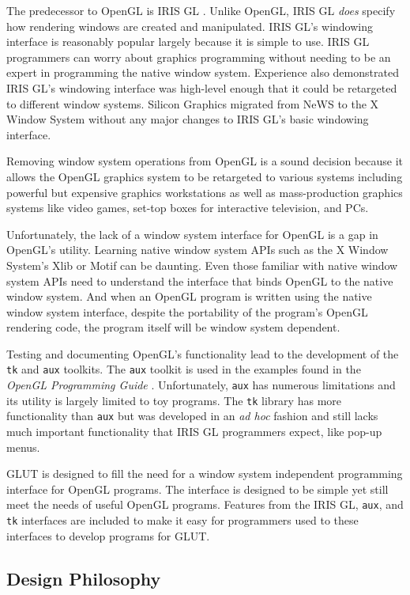 The predecessor to OpenGL is IRIS GL \cite{sgi91a,sgi91b}.
 Unlike OpenGL, IRIS GL {\em does}
specify how rendering windows are created and manipulated.  IRIS GL's
windowing interface is reasonably popular largely because it is simple
to use.  IRIS GL programmers can worry about graphics programming without
needing to be an expert in programming the native window system.
Experience also demonstrated IRIS GL's windowing interface was high-level
enough that it could be retargeted to different window systems.  Silicon
Graphics migrated from NeWS to the X Window System without any major
changes to IRIS GL's basic windowing interface.

Removing window system operations from OpenGL is a sound decision
because it allows the OpenGL graphics system to be retargeted to
various systems including powerful but expensive graphics
workstations as well as mass-production graphics systems like video
games, set-top boxes for interactive television, and PCs.

Unfortunately, the lack of a window system interface for OpenGL
is a gap in OpenGL's utility.  Learning native window system APIs
such as the X Window System's Xlib \cite{kilgard94a} or
Motif \cite{kilgard94b} can be daunting.
Even those familiar with native window system APIs need to
understand the interface that binds OpenGL to the native window system.
And when an OpenGL program is written using the native window system
interface, despite the portability of the program's OpenGL rendering
code, the program itself will be window system dependent.

Testing and documenting OpenGL's functionality lead to
the development of the {\tt tk} and {\tt aux} toolkits.  The {\tt aux}
toolkit is used in the examples found in the {\em OpenGL Programming Guide}
\cite{neider93}.
Unfortunately, {\tt aux} has numerous limitations and its utility is
largely limited to toy programs.  The {\tt tk} library has
more functionality than {\tt aux} but was developed in an {\em ad hoc}
fashion and still lacks much important functionality that IRIS GL
programmers expect, like pop-up menus.

GLUT is designed to fill the need for a window system independent
programming interface for OpenGL programs.  The interface is designed
to be simple yet still meet the needs of useful OpenGL programs.
Features from the IRIS GL, {\tt aux}, and {\tt tk} interfaces are
included to make it easy for programmers used to these interfaces
to develop programs for GLUT.

\subsection{Design Philosophy}

